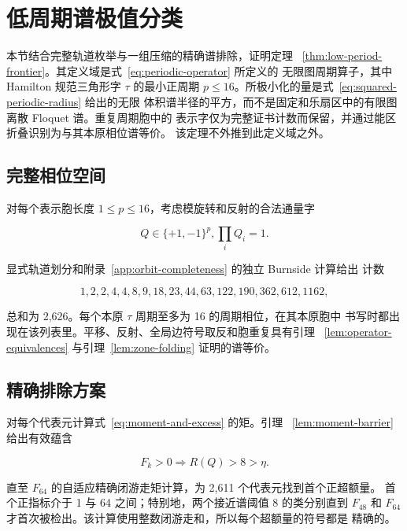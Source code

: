 \section{低周期谱极值分类}\label{sec:low-period-frontier}

本节结合完整轨道枚举与一组压缩的精确谱排除，证明定理~
\ref{thm:low-period-frontier}。其定义域是式~\eqref{eq:periodic-operator} 所定义的
无限图周期算子，其中 Hamilton 规范三角形字 \(\tau\) 的最小正周期
\(p\leq16\)。所极小化的量是式~\eqref{eq:squared-periodic-radius} 给出的无限
体积谱半径的平方，而不是固定和乐扇区中的有限图离散 Floquet 谱。重复周期胞中的
表示字仅为完整证书计数而保留，并通过能区折叠识别为与其本原相位谱等价。
该定理不外推到此定义域之外。

\subsection{完整相位空间}

对每个表示胞长度 \(1\leq p\leq16\)，考虑模旋转和反射的合法通量字

\begin{equation}
\label{eq:legal-periodic-flux}
Q \in \{+1,-1\}^p,       \prod_i Q_i=1.
\end{equation}

显式轨道划分和附录~\ref{app:orbit-completeness} 的独立 Burnside 计算给出
计数

\begin{equation}
\label{eq:low-period-orbit-counts}
1,2,2,4,4,8,9,18,23,44,63,122,190,362,612,1162,
\end{equation}

总和为 2,626。每个本原 \(\tau\) 周期至多为 16 的周期相位，在其本原胞中
书写时都出现在该列表里。平移、反射、全局边符号取反和胞重复具有引理~
\ref{lem:operator-equivalences} 与引理~\ref{lem:zone-folding} 证明的谱等价。

\subsection{精确排除方案}

对每个代表元计算式~\eqref{eq:moment-and-excess} 的矩。引理~
\ref{lem:moment-barrier} 给出有效蕴含

\begin{equation}
\label{eq:frontier-moment-exclusion}
F_k>0 \Longrightarrow R(Q)>8>\eta.
\end{equation}

直至 \(F_{64}\) 的自适应精确闭游走矩计算，为 2,611 个代表元找到首个正超额量。
首个正指标介于 1 与 64 之间；特别地，两个接近谱阈值 8 的类分别直到 \(F_{48}\) 和
\(F_{64}\) 才首次被检出。该计算使用整数闭游走和，所以每个超额量的符号都是
精确的。

